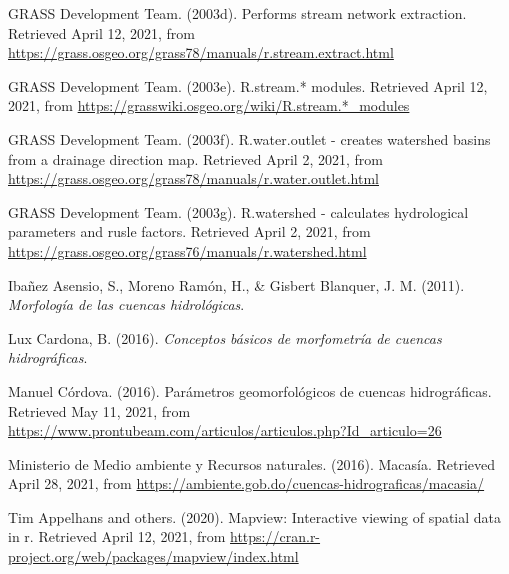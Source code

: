 \documentclass[11pt,]{article}
\begin{document}
\hypertarget{ref-addonrstreamextract}{}
GRASS Development Team. (2003d). Performs stream network extraction.
Retrieved April 12, 2021, from
\url{https://grass.osgeo.org/grass78/manuals/r.stream.extract.html}

\hypertarget{ref-addonrstream}{}
GRASS Development Team. (2003e). R.stream.* modules. Retrieved April 12,
2021, from \url{https://grasswiki.osgeo.org/wiki/R.stream.*_modules}

\hypertarget{ref-addonrwateroutlet}{}
GRASS Development Team. (2003f). R.water.outlet - creates watershed
basins from a drainage direction map. Retrieved April 2, 2021, from
\url{https://grass.osgeo.org/grass78/manuals/r.water.outlet.html}

\hypertarget{ref-addonrwater}{}
GRASS Development Team. (2003g). R.watershed - calculates hydrological
parameters and rusle factors. Retrieved April 2, 2021, from
\url{https://grass.osgeo.org/grass76/manuals/r.watershed.html}

\hypertarget{ref-ibanez2011morfologia}{}
Ibañez Asensio, S., Moreno Ramón, H., \& Gisbert Blanquer, J. M. (2011).
\emph{Morfología de las cuencas hidrológicas}.

\hypertarget{ref-lux2016conceptos}{}
Lux Cardona, B. (2016). \emph{Conceptos básicos de morfometría de
cuencas hidrográficas}.

\hypertarget{ref-ManuelCordova}{}
Manuel Córdova. (2016). Parámetros geomorfológicos de cuencas
hidrográficas. Retrieved May 11, 2021, from
\url{https://www.prontubeam.com/articulos/articulos.php?Id_articulo=26}

\hypertarget{ref-MedioAmbiente}{}
Ministerio de Medio ambiente y Recursos naturales. (2016). Macasía.
Retrieved April 28, 2021, from
\url{https://ambiente.gob.do/cuencas-hidrograficas/macasia/}

\hypertarget{ref-mapview}{}
Tim Appelhans and others. (2020). Mapview: Interactive viewing of
spatial data in r. Retrieved April 12, 2021, from
\url{https://cran.r-project.org/web/packages/mapview/index.html}




\newpage
\singlespacing 
\end{document}
